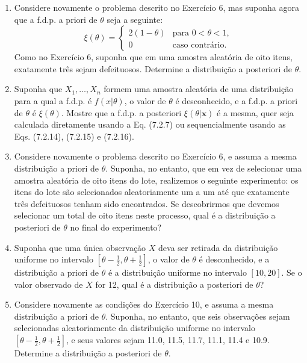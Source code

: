 \begin{enumerate}
    \item Considere novamente o problema descrito no Exercício 6, mas suponha agora que a f.d.p. a priori de $\theta$ seja a seguinte:
    $$ \xi(\theta) = 
    \begin{cases}
        2(1-\theta) & \text{para } 0 < \theta < 1, \\
        0 & \text{caso contrário.}
    \end{cases}
    $$
    Como no Exercício 6, suponha que em uma amostra aleatória de oito itens, exatamente três sejam defeituosos. Determine a distribuição a posteriori de $\theta$.

    \item Suponha que $X_1, \dots, X_n$ formem uma amostra aleatória de uma distribuição para a qual a f.d.p. é $f(x|\theta)$, o valor de $\theta$ é desconhecido, e a f.d.p. a priori de $\theta$ é $\xi(\theta)$. Mostre que a f.d.p. a posteriori $\xi(\theta|\mathbf{x})$ é a mesma, quer seja calculada diretamente usando a Eq. (7.2.7) ou sequencialmente usando as Eqs. (7.2.14), (7.2.15) e (7.2.16).

    \item Considere novamente o problema descrito no Exercício 6, e assuma a mesma distribuição a priori de $\theta$. Suponha, no entanto, que em vez de selecionar uma amostra aleatória de oito itens do lote, realizemos o seguinte experimento: os itens do lote são selecionados aleatoriamente um a um até que exatamente três defeituosos tenham sido encontrados. Se descobrirmos que devemos selecionar um total de oito itens neste processo, qual é a distribuição a posteriori de $\theta$ no final do experimento?
    
    \item Suponha que uma única observação $X$ deva ser retirada da distribuição uniforme no intervalo $[\theta - \frac{1}{2}, \theta + \frac{1}{2}]$, o valor de $\theta$ é desconhecido, e a distribuição a priori de $\theta$ é a distribuição uniforme no intervalo $[10, 20]$. Se o valor observado de $X$ for 12, qual é a distribuição a posteriori de $\theta$?
    
    \item Considere novamente as condições do Exercício 10, e assuma a mesma distribuição a priori de $\theta$. Suponha, no entanto, que seis observações sejam selecionadas aleatoriamente da distribuição uniforme no intervalo $[\theta - \frac{1}{2}, \theta + \frac{1}{2}]$, e seus valores sejam 11.0, 11.5, 11.7, 11.1, 11.4 e 10.9. Determine a distribuição a posteriori de $\theta$.
\end{enumerate}